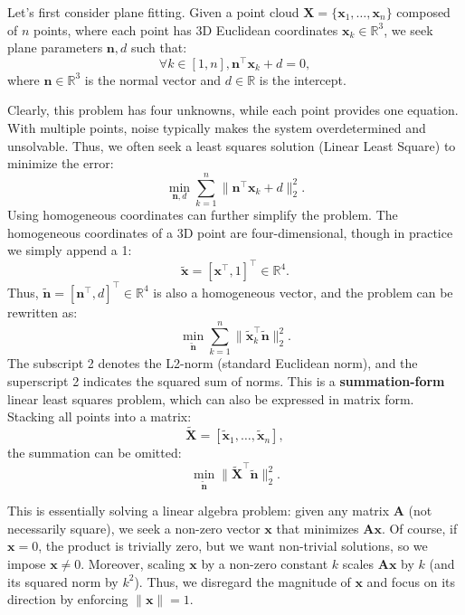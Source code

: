 Let's first consider plane fitting. Given a point cloud $\mathbf{X} = \{ \mathbf{x}_1, \ldots, \mathbf{x}_n \}$ composed of $n$ points, where each point has 3D Euclidean coordinates $\mathbf{x}_k \in \mathbb{R}^3$, we seek plane parameters $\mathbf{n}, d$ such that:
\begin{equation}
	\forall k \in [1, n], \mathbf{n}^\top \mathbf{x}_k + d = 0,
\end{equation}
where $\mathbf{n} \in \mathbb{R}^3$ is the normal vector and $d \in \mathbb{R}$ is the intercept.

Clearly, this problem has four unknowns, while each point provides one equation. With multiple points, noise typically makes the system overdetermined and unsolvable. Thus, we often seek a least squares solution (Linear Least Square) to minimize the error:
\begin{equation}
	\min_{\mathbf{n}, d} \sum_{k=1}^{n} \| \mathbf{n}^\top \mathbf{x}_k + d \|_2^2.
\end{equation}
Using homogeneous coordinates can further simplify the problem. The homogeneous coordinates of a 3D point are four-dimensional, though in practice we simply append a 1:
\begin{equation}
	\tilde{\mathbf{x}} = [\mathbf{x}^\top, 1]^\top \in \mathbb{R}^4.
\end{equation}
Thus, $\tilde{\mathbf{n}} = [\mathbf{n}^\top, d]^\top \in \mathbb{R}^4$ is also a homogeneous vector, and the problem can be rewritten as:
\begin{equation}\label{eq.6.6}
	\min_{\tilde{\mathbf{n}}} \sum_{k=1}^{n} \| \tilde{\mathbf{x}}^\top_k \tilde{\mathbf{n}} \|_2^2.
\end{equation}
The subscript 2 denotes the L2-norm (standard Euclidean norm), and the superscript 2 indicates the squared sum of norms. This is a \textbf{summation-form} linear least squares problem, which can also be expressed in matrix form. Stacking all points into a matrix:
\begin{equation}
	\tilde{\mathbf{X}} = [\tilde{\mathbf{x}}_1, \ldots, \tilde{\mathbf{x}}_n],
\end{equation}
the summation can be omitted:
\begin{equation}
	\min_{\tilde{\mathbf{n}}} \| \tilde{\mathbf{X}}^\top \tilde{\mathbf{n}} \|_2^2.
\end{equation}

This is essentially solving a linear algebra problem: given any matrix $\mathbf{A}$ (not necessarily square), we seek a non-zero vector $\mathbf{x}$ that minimizes $\mathbf{A} \mathbf{x}$. Of course, if $\mathbf{x} = 0$, the product is trivially zero, but we want non-trivial solutions, so we impose $\mathbf{x} \neq 0$. Moreover, scaling $\mathbf{x}$ by a non-zero constant $k$ scales $\mathbf{A}\mathbf{x}$ by $k$ (and its squared norm by $k^2$). Thus, we disregard the magnitude of $\mathbf{x}$ and focus on its direction by enforcing $\|\mathbf{x}\|=1$.

